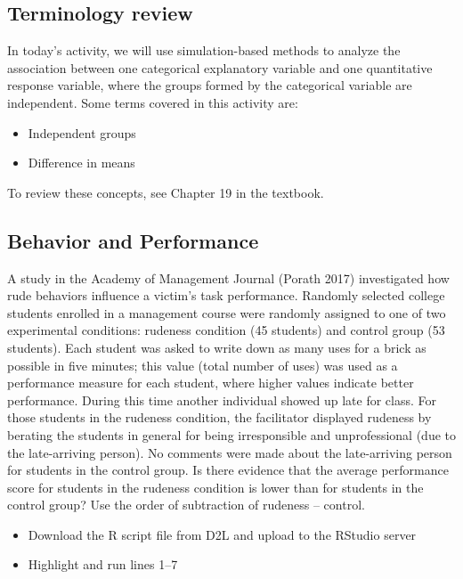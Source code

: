 \documentclass[
]{report}
\begin{document}
\subsection{Terminology review}\label{terminology-review-21}

In today's activity, we will use simulation-based methods to analyze the association between one categorical explanatory variable and one quantitative response variable, where the groups formed by the categorical variable are independent. Some terms covered in this activity are:

\begin{itemize}
\item
  Independent groups
\item
  Difference in means
\end{itemize}

To review these concepts, see Chapter 19 in the textbook.

\subsection{Behavior and Performance}\label{behavior-and-performance}

A study in the Academy of Management Journal (Porath 2017) investigated how rude behaviors influence a victim's task performance. Randomly selected college students enrolled in a management course were randomly assigned to one of two experimental conditions: rudeness condition (45 students) and control group (53 students). Each student was asked to write down as many uses for a brick as possible in five minutes; this value (total number of uses) was used as a performance measure for each student, where higher values indicate better performance. During this time another individual showed up late for class. For those students in the rudeness condition, the facilitator displayed rudeness by berating the students in general for being irresponsible and unprofessional (due to the late-arriving person). No comments were made about the late-arriving person for students in the control group. Is there evidence that the average performance score for students in the rudeness condition is lower than for students in the control group? Use the order of subtraction of rudeness -- control.

\begin{itemize}
\item
  Download the R script file from D2L and upload to the RStudio server
\item
  Highlight and run lines 1--7
\end{itemize}
\end{document}
